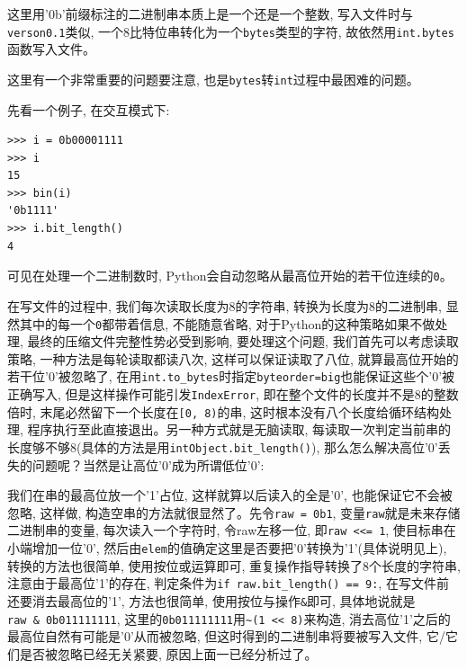 \documentclass{ctexart}
\begin{document}
这里用'0b'前缀标注的二进制串本质上是一个还是一个整数, 写入文件时与\texttt{verson0.1}类似, 一个8比特位串转化为一个\texttt{bytes}类型的字符, 故依然用\texttt{int.bytes}函数写入文件。

这里有一个非常重要的问题要注意, 也是\texttt{bytes}转\texttt{int}过程中最困难的问题。

先看一个例子, 在交互模式下:

{\setmainfont{Courier New Bold}              
\begin{lstlisting}
>>> i = 0b00001111
>>> i
15
>>> bin(i)
'0b1111'
>>> i.bit_length()
4
\end{lstlisting}}

可见在处理一个二进制数时, Python会自动忽略从最高位开始的若干位连续的\texttt{\textquotesingle{}0\textquotesingle{}}。

在写文件的过程中, 我们每次读取长度为8的字符串, 转换为长度为8的二进制串, 显然其中的每一个\texttt{0}都带着信息, 不能随意省略, 对于Python的这种策略如果不做处理, 最终的压缩文件完整性势必受到影响, 要处理这个问题, 我们首先可以考虑读取策略, 一种方法是每轮读取都读八次, 这样可以保证读取了八位, 就算最高位开始的若干位'0'被忽略了, 在用\texttt{int.to\_bytes}时指定\texttt{byteorder=\textquotesingle{}big\textquotesingle{}}也能保证这些个'0'被正确写入, 但是这样操作可能引发\texttt{IndexError}, 即在整个文件的长度并不是8的整数倍时, 末尾必然留下一个长度在\texttt{{[}0,\ 8)}的串, 这时根本没有八个长度给循环结构处理, 程序执行至此直接退出。另一种方式就是无脑读取, 每读取一次判定当前串的长度够不够8(具体的方法是用\texttt{intObject.bit\_length()}), 那么怎么解决高位'0'丢失的问题呢？当然是让高位'0'成为所谓低位'0':

我们在串的最高位放一个'1'占位, 这样就算以后读入的全是'0', 也能保证它不会被忽略, 这样做, 构造空串的方法就很显然了。先令\texttt{raw\ =\ 0b1}, 变量\texttt{raw}就是未来存储二进制串的变量, 每次读入一个字符时, 令raw左移一位, 即\texttt{raw\ \textless{}\textless{}=\ 1}, 使目标串在小端增加一位'0', 然后由\texttt{elem}的值确定这里是否要把'0'转换为'1'(具体说明见上), 转换的方法也很简单, 使用按位或运算\texttt{\textbar{}}即可,
重复操作指导转换了8个长度的字符串, 注意由于最高位'1'的存在, 判定条件为\texttt{if\ raw.bit\_length()\ ==\ 9:}, 在写文件前还要消去最高位的'1', 方法也很简单, 使用按位与操作\texttt{\&}即可, 具体地说就是\texttt{raw\ \&\ 0b011111111}, 这里的\texttt{0b011111111}用\texttt{\textasciitilde{}(1\ \textless{}\textless{}\ 8)}来构造, 消去高位'1'之后的最高位自然有可能是'0'从而被忽略, 但这时得到的二进制串将要被写入文件, 它/它们是否被忽略已经无关紧要, 原因上面一已经分析过了。
\end{document}
